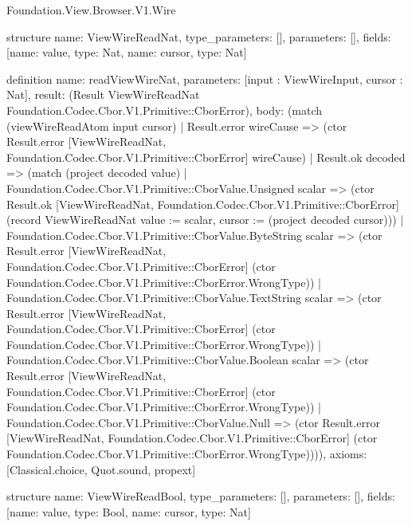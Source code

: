 \begin{lexlean}{Foundation.View.Browser.V1.Wire}
\begin{semanticmodule}
structure{
  name: ViewWireReadNat,
  type_parameters: [],
  parameters: [],
  fields: [{name: value, type: Nat}, {name: cursor, type: Nat}]
}

definition{
  name: readViewWireNat,
  parameters: [input : ViewWireInput, cursor : Nat],
  result: (Result ViewWireReadNat Foundation.Codec.Cbor.V1.Primitive::CborError),
  body: (match (viewWireReadAtom input cursor)
    | Result.error wireCause => (ctor Result.error [ViewWireReadNat, Foundation.Codec.Cbor.V1.Primitive::CborError] wireCause)
    | Result.ok decoded => (match (project decoded value)
      | Foundation.Codec.Cbor.V1.Primitive::CborValue.Unsigned scalar => (ctor Result.ok [ViewWireReadNat, Foundation.Codec.Cbor.V1.Primitive::CborError] (record ViewWireReadNat {value := scalar, cursor := (project decoded cursor)}))
      | Foundation.Codec.Cbor.V1.Primitive::CborValue.ByteString scalar => (ctor Result.error [ViewWireReadNat, Foundation.Codec.Cbor.V1.Primitive::CborError] (ctor Foundation.Codec.Cbor.V1.Primitive::CborError.WrongType))
      | Foundation.Codec.Cbor.V1.Primitive::CborValue.TextString scalar => (ctor Result.error [ViewWireReadNat, Foundation.Codec.Cbor.V1.Primitive::CborError] (ctor Foundation.Codec.Cbor.V1.Primitive::CborError.WrongType))
      | Foundation.Codec.Cbor.V1.Primitive::CborValue.Boolean scalar => (ctor Result.error [ViewWireReadNat, Foundation.Codec.Cbor.V1.Primitive::CborError] (ctor Foundation.Codec.Cbor.V1.Primitive::CborError.WrongType))
      | Foundation.Codec.Cbor.V1.Primitive::CborValue.Null => (ctor Result.error [ViewWireReadNat, Foundation.Codec.Cbor.V1.Primitive::CborError] (ctor Foundation.Codec.Cbor.V1.Primitive::CborError.WrongType)))),
  axioms: [Classical.choice, Quot.sound, propext]
}

structure{
  name: ViewWireReadBool,
  type_parameters: [],
  parameters: [],
  fields: [{name: value, type: Bool}, {name: cursor, type: Nat}]
}


\end{semanticmodule}
\end{lexlean}
